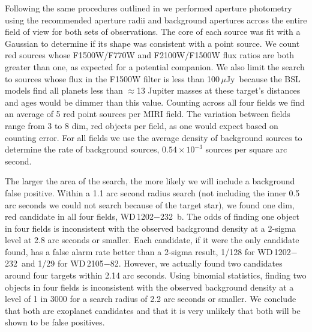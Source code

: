 \documentclass[twocolumn]{aastex631}
\newcommand{\muJy}{\,$\mu$Jy}
\newcommand{\wdA}{WD\,1202$-$232}
\newcommand{\wdB}{WD\,2105$-$82}
\begin{document}
Following the same procedures outlined in \citet{Poulsen2023} we performed aperture photometry using the recommended aperture radii and background apertures across the entire field of view for both sets of observations. The core of each source was fit with a Gaussian to determine if its shape was consistent with a point source. We count red sources whose F1500W/F770W and F2100W/F1500W flux ratios are both greater than one, as expected for a potential companion. We also limit the search to sources whose flux in the F1500W filter is less than 100\muJy\ because the BSL models find all planets less than $\approx$13 Jupiter masses at these target's distances and ages would be dimmer than this value.
Counting across all four fields we find an average of 5 red point sources per MIRI field. The variation between fields range from 3 to 8 dim, red objects per field, as one would expect based on counting error. For all fields we use the average density of background sources to determine the rate of background sources, $0.54\times 10^{-3}$ sources per square arc second. 

The larger the area of the search, the more likely we will include a background false positive. Within a 1.1 arc second radius search (not including the inner 0.5 arc seconds we could not search because of the target star), we found one dim, red candidate in all four fields, \wdA~b. The odds of finding one object in four fields is inconsistent with the observed background density at a 2-sigma level at 2.8 arc seconds or smaller. Each candidate, if it were the only candidate found, has a false alarm rate better than a 2-sigma result, 1/128 for \wdA\ and 1/29 for \wdB. However, we actually found two candidates around four targets within 2.14 arc seconds. Using binomial statistics, finding two objects in four fields is inconsistent with the observed background density at a level of 1 in 3000 for a search radius of 2.2 arc seconds or smaller. We conclude that both are exoplanet candidates and that it is very unlikely that both will be shown to be false positives.
\end{document}
